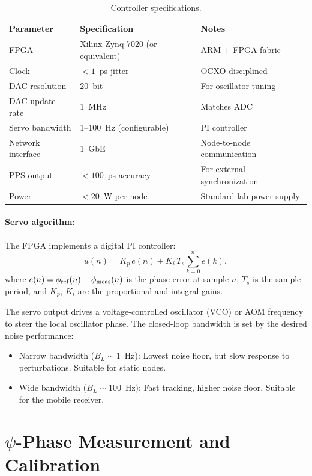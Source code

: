 \documentclass[12pt,letterpaper]{article}
\begin{document}
\begin{table}[h]
\centering
\caption{Controller specifications.}
\label{tab:controller}
\begin{tabular}{@{}lll@{}}
\toprule
Parameter & Specification & Notes \\
\midrule
FPGA & Xilinx Zynq 7020 (or equivalent) & ARM + FPGA fabric \\
Clock & $< 1$~ps jitter & OCXO-disciplined \\
DAC resolution & 20~bit & For oscillator tuning \\
DAC update rate & 1~MHz & Matches ADC \\
Servo bandwidth & 1--100~Hz (configurable) & PI controller \\
Network interface & 1~GbE & Node-to-node communication \\
PPS output & $< 100$~ps accuracy & For external synchronization \\
Power & $< 20$~W per node & Standard lab power supply \\
\bottomrule
\end{tabular}
\end{table}

\paragraph{Servo algorithm:}
The FPGA implements a digital PI controller:
\begin{equation}
u(n) = K_p\,e(n) + K_i\,T_s\sum_{k=0}^{n} e(k),
\end{equation}
where $e(n) = \phi_{\rm ref}(n) - \phi_{\rm meas}(n)$ is the phase error
at sample $n$, $T_s$ is the sample period, and $K_p$, $K_i$ are the
proportional and integral gains.

The servo output drives a voltage-controlled oscillator (VCO) or AOM
frequency to steer the local oscillator phase. The closed-loop bandwidth is
set by the desired noise performance:
\begin{itemize}
\item Narrow bandwidth ($B_L \sim 1$~Hz): Lowest noise floor, but slow
response to perturbations. Suitable for static nodes.
\item Wide bandwidth ($B_L \sim 100$~Hz): Fast tracking, higher noise floor.
Suitable for the mobile receiver.
\end{itemize}

\section{$\psi$-Phase Measurement and Calibration}
\end{document}

